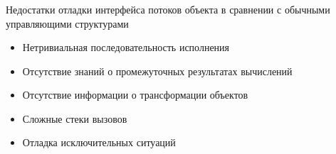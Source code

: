 \begin{frame}
\frametitle{\insertsection} 
\framesubtitle{\insertsubsection}
Недостатки отладки интерфейса потоков объекта в сравнении с обычными управляющими структурами
\begin{itemize}
	\item Нетривиальная последовательность исполнения
	\item Отсутствие знаний о промежуточных результатах вычислений 
	\item Отсутствие информации о трансформации объектов
	\item Сложные стеки вызовов
	\item Отладка исключительных ситуаций
\end{itemize}
\end{frame}
